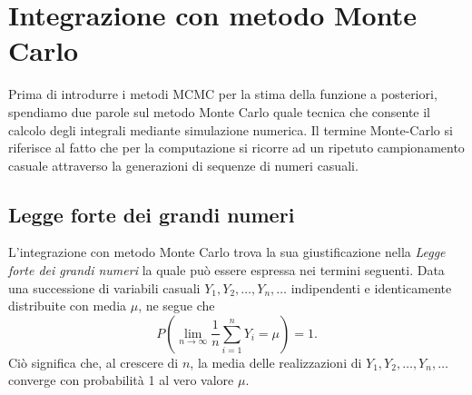 \section{Integrazione con metodo Monte Carlo}
\label{sec:integr_MC}

Prima di introdurre i metodi MCMC per la stima della funzione a posteriori, spendiamo due parole sul metodo Monte Carlo quale tecnica che consente il calcolo degli integrali mediante simulazione numerica.
Il termine Monte-Carlo si riferisce al fatto che per la computazione si ricorre
ad un ripetuto campionamento casuale attraverso la generazioni di sequenze di numeri casuali.


\subsection{Legge forte dei grandi numeri}
\label{sec:legge_forte_grandi_numeri}

L'integrazione con metodo Monte Carlo trova la sua giustificazione nella \emph{Legge forte dei grandi numeri} la quale può essere espressa nei termini seguenti.
Data una successione di variabili casuali $Y_{1}, Y_{2},\dots, Y_{n},\dots$ indipendenti e identicamente distribuite con media $\mu$, ne segue che
\begin{equation}
P\left( \lim_{n \rightarrow \infty} \frac{1}{n} \sum_{i=1}^n Y_i = \mu \right) = 1.
\end{equation}
Ciò significa che, al crescere di $n$, la media delle realizzazioni di $Y_{1}, Y_{2},\dots, Y_{n},\dots$ converge con probabilità 1 al vero valore $\mu$.

